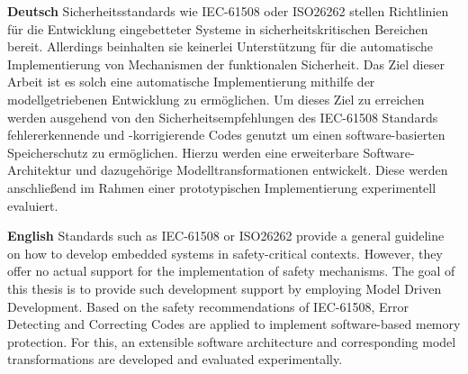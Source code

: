 \textbf{Deutsch}
Sicherheitsstandards wie IEC-61508 oder ISO26262 stellen Richtlinien für die Entwicklung eingebetteter Systeme in sicherheitskritischen Bereichen bereit. Allerdings beinhalten sie keinerlei Unterstützung für die automatische Implementierung von Mechanismen der funktionalen Sicherheit. Das Ziel dieser Arbeit ist es solch eine automatische Implementierung mithilfe der modellgetriebenen Entwicklung zu ermöglichen. Um dieses Ziel zu erreichen werden ausgehend von den Sicherheitsempfehlungen des IEC-61508 Standards fehlererkennende und -korrigierende Codes genutzt um einen software-basierten Speicherschutz zu ermöglichen. Hierzu werden eine erweiterbare Software-Architektur und dazugehörige Modelltransformationen entwickelt. Diese werden anschließend im Rahmen einer prototypischen Implementierung experimentell evaluiert.



\bigskip

\noindent
\textbf{English} 
Standards such as IEC-61508 or ISO26262 provide a general guideline on how to develop embedded systems in safety-critical contexts. However, they offer no actual support for the implementation of safety mechanisms. The goal of this thesis is to provide such development support by employing Model Driven Development. Based on the safety recommendations of IEC-61508, Error Detecting and Correcting Codes are applied to implement software-based memory protection. For this, an extensible software architecture and corresponding model transformations are developed and evaluated experimentally.

